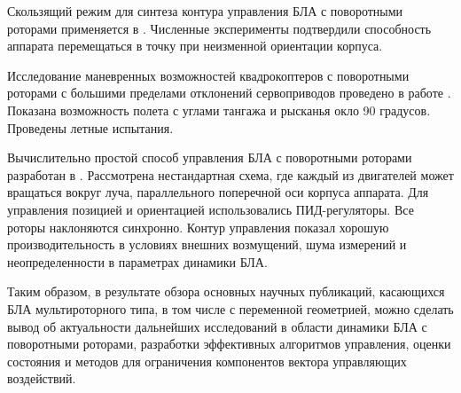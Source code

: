 Скользящий режим для синтеза контура управления БЛА с поворотными роторами применяется в \cite{Yih01}. 
Численные эксперименты подтвердили способность аппарата перемещаться в точку при неизменной ориентации корпуса.

Исследование маневренных возможностей квадрокоптеров с поворотными роторами с большими пределами отклонений сервоприводов проведено в работе \cite{Oosedo01}.
Показана возможность полета с углами тангажа и рысканья окло 90 градусов.
Проведены летные испытания.

Вычислительно простой способ управления БЛА с поворотными роторами разработан в \cite{Alkamachi01}. Рассмотрена нестандартная схема, где каждый из двигателей может вращаться вокруг луча,
параллельного поперечной оси корпуса аппарата.
Для управления позицией и ориентацией использовались ПИД-регуляторы.
Все роторы наклоняются синхронно.
Контур управления показал хорошую производительность в условиях внешних возмущений, шума измерений и неопределенности в параметрах динамики БЛА.

Таким образом, в результате обзора основных научных публикаций, касающихся БЛА мультироторного типа, в том числе с переменной геометрией, можно сделать вывод об актуальности дальнейших исследований в области динамики БЛА с поворотными роторами, разработки эффективных алгоритмов управления, оценки состояния и методов для ограничения компонентов вектора управляющих воздействий.

